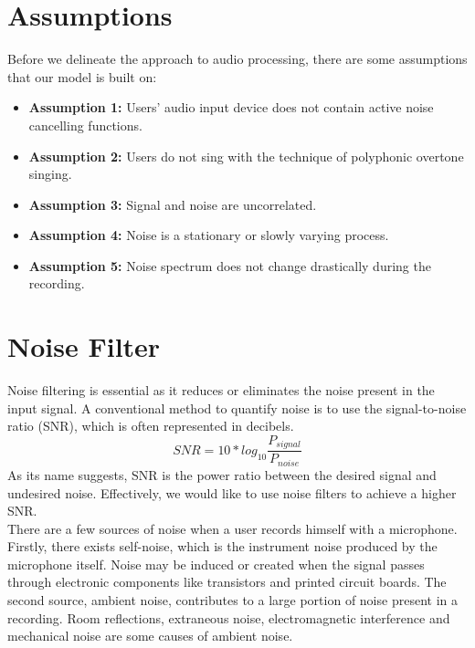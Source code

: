\section{Assumptions}
Before we delineate the approach to audio processing, there are some assumptions that our model
is built on:
\begin{itemize}
	\item \textbf{Assumption 1:} Users' audio input device does not contain active noise cancelling functions.
	\item \textbf{Assumption 2:} Users do not sing with the technique of polyphonic overtone singing.
	\item \textbf{Assumption 3:} Signal and noise are uncorrelated.
	\item \textbf{Assumption 4:} Noise is a stationary or slowly varying process.
	\item \textbf{Assumption 5:} Noise spectrum does not change drastically during the recording.
\end{itemize}

\section{Noise Filter}
\label{sec:NF}
Noise filtering is essential as it reduces or eliminates the noise present in the input signal.
A conventional method to quantify noise is to use the signal-to-noise ratio (SNR), which is often 
represented in decibels.
\[SNR=10*log_{10}\frac{P_{signal}}{P_{noise}}\]
As its name suggests, SNR is the power ratio between the desired signal and undesired noise. Effectively,
we would like to use noise filters to achieve a higher SNR.\\ 
There are a few sources of noise when a user records himself with a microphone.
Firstly, there exists self-noise, which is the instrument noise produced by the microphone itself.
Noise may be induced or created when the signal passes through electronic components like transistors 
and printed circuit boards.
The second source, ambient noise, contributes to a large portion of noise present in a recording.
Room reflections, extraneous noise, electromagnetic interference and mechanical noise are some causes 
of ambient noise.  

